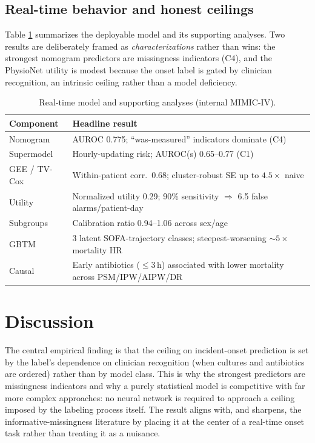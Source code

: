 \documentclass[conference]{IEEEtran}
\begin{document}
\subsection{Real-time behavior and honest ceilings}
Table \ref{tab:analyses} summarizes the deployable model and its supporting
analyses. Two results are deliberately framed as \emph{characterizations}
rather than wins: the strongest nomogram predictors are missingness indicators
(C4), and the PhysioNet utility is modest because the onset label is gated by
clinician recognition, an intrinsic ceiling rather than a model deficiency.

\begin{table}[t]
\caption{Real-time model and supporting analyses (internal MIMIC-IV).}
\label{tab:analyses}
\centering
\begin{tabular}{p{}p{}}
\toprule
\textbf{Component} & \textbf{Headline result} \\
\midrule
Nomogram        & AUROC 0.775; ``was-measured'' indicators dominate (C4) \\
Supermodel      & Hourly-updating risk; AUROC(s) 0.65--0.77 (C1) \\
GEE / TV-Cox    & Within-patient corr.\ 0.68; cluster-robust SE up to $4.5\times$ naive \\
Utility         & Normalized utility 0.29; 90\% sensitivity $\Rightarrow$ 6.5 false alarms/patient-day \\
Subgroups       & Calibration ratio 0.94--1.06 across sex/age \\
GBTM            & 3 latent SOFA-trajectory classes; steepest-worsening $\sim 5\times$ mortality HR \\
Causal          & Early antibiotics ($\le 3$\,h) associated with lower mortality across PSM/IPW/AIPW/DR \\
\bottomrule
\end{tabular}
\end{table}

\section{Discussion}
\label{sec:discussion}
The central empirical finding is that the ceiling on incident-onset prediction
is set by the label's dependence on clinician recognition (when cultures and
antibiotics are ordered) rather than by model class. This is why the strongest
predictors are missingness indicators and why a purely statistical model is
competitive with far more complex approaches: no neural network is required to
approach a ceiling imposed by the labeling process itself. The result aligns
with, and sharpens, the informative-missingness literature
\cite{groenwold2020missingness,singh2021missingness} by placing it at the
center of a real-time onset task rather than treating it as a nuisance.
\end{document}

